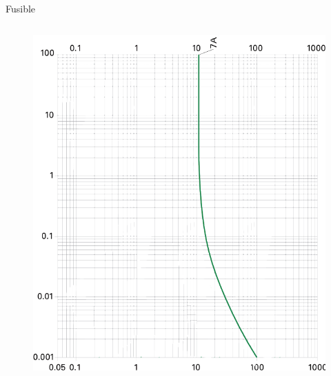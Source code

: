 \begin{frame}{Fusible}
\begin{columns}
        \begin{column}{0.6\textwidth}
            \vspace{-12pt}
            \begin{figure}
                \centering
                \includegraphics[width=\textwidth, height=0.75\textheight, keepaspectratio]{pictures/fuse-curve.png}
            \end{figure}
        \end{column}
    \end{columns}
\end{frame}

